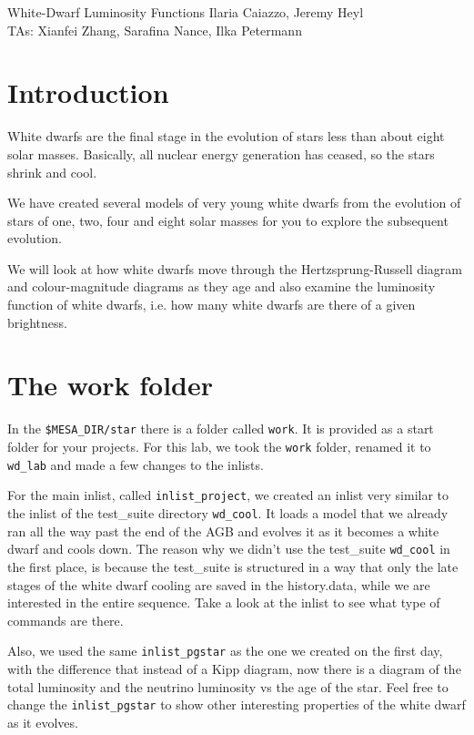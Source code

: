 \documentclass{article}
\begin{document}
\begin{titlebox}{White-Dwarf Luminosity Functions}
Ilaria Caiazzo, Jeremy Heyl \\
TAs: Xianfei Zhang, Sarafina Nance, Ilka Petermann
\end{titlebox}

\section{Introduction}

White dwarfs are the final stage in the evolution of stars less than about eight solar masses.  Basically, all nuclear energy generation has ceased, so the stars shrink and cool.  

We have created several models of very young white dwarfs from the evolution of stars of one, two, four and eight solar masses for you to explore the subsequent evolution.

We will look at how white dwarfs move through the Hertzsprung-Russell diagram and colour-magnitude diagrams as they age and also examine the luminosity function of white dwarfs, i.e. how many white dwarfs are there of a given brightness.

\section{The work folder}

In the \texttt{\$MESA\_DIR/star} there is a folder called \texttt{work}. It is provided as a start folder for your projects. For this lab, we took the \texttt{work} folder, renamed it to \texttt{wd\_lab} and made a few changes to the inlists.

For the main inlist, called \texttt{inlist\_project}, we created an inlist very similar to the inlist of the test\_suite directory \texttt{wd\_cool}. It loads a model that we already ran all the way past the end of the AGB and evolves it as it becomes a white dwarf and cools down. The reason why we didn't use the test\_suite \texttt{wd\_cool} in the first place, is because the test\_suite is structured in a way that only the late stages of the white dwarf cooling are saved in the history.data, while we are interested in the entire sequence. Take a look at the inlist to see what type of commands are there.

Also, we used the same \texttt{inlist\_pgstar} as the one we created on the first day, with the difference that instead of a Kipp diagram, now there is a diagram of the total luminosity and the neutrino luminosity vs the age of the star. Feel free to change the \texttt{inlist\_pgstar} to show other interesting properties of the white dwarf as it evolves.
\end{document}
